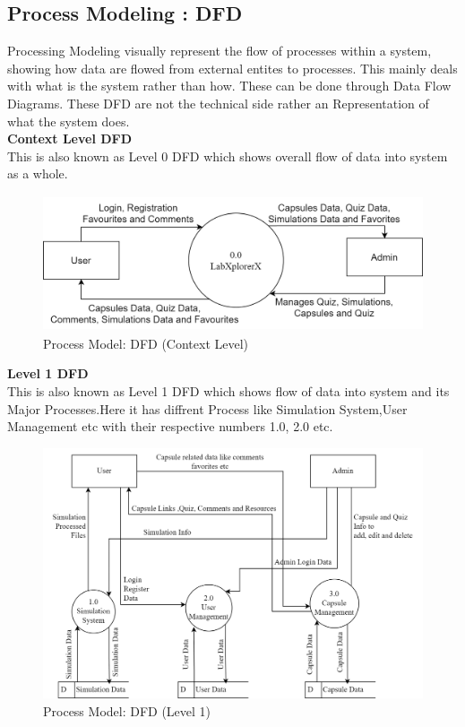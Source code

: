 \subsection{Process Modeling : DFD}
Processing Modeling visually represent the flow of processes within a system, showing how data are flowed from external entites to processes. This mainly deals with what is the system rather than how. These can be done through Data Flow Diagrams. These DFD are not the technical side rather an Representation of what the system does.\\
\textbf{Context Level DFD}\\
This is also known as Level 0 DFD which shows overall flow of data into system as a whole.
\begin{figure}[H]
    \centering
        \includegraphics[height = 4cm]{Diagrams/ProcessModelling.png}
    \caption{Process Model: DFD (Context Level)}
\end{figure}
\vspace{-1em}
\textbf{Level 1 DFD}\\
This is also known as Level 1 DFD which shows flow of data into system and its Major Processes.Here it has diffrent Process like Simulation System,User Management etc with their respective numbers 1.0, 2.0 etc.
\begin{figure}[H]
    \centering
        \includegraphics[width = 12.25cm]{Diagrams/Process 1.png}
    \caption{Process Model: DFD (Level 1)}
\end{figure}
